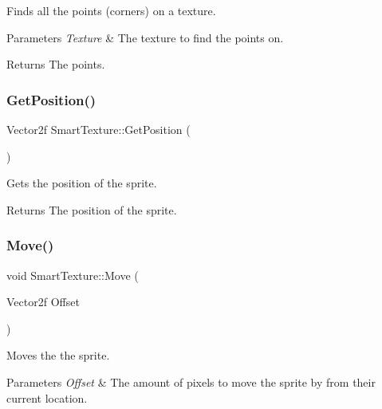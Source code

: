 Finds all the points (corners) on a texture. 


\begin{DoxyParams}{Parameters}
{\em Texture} & The texture to find the points on.\\
\hline
\end{DoxyParams}
\begin{DoxyReturn}{Returns}
The points.
\end{DoxyReturn}
\mbox{\label{struct_smart_texture_aec1d814d4f3dbbc6d5bf39e569b5fa30}} 
\subsubsection{\texorpdfstring{Get\+Position()}{GetPosition()}}
{\footnotesize\ttfamily Vector2f Smart\+Texture\+::\+Get\+Position (\begin{DoxyParamCaption}{ }\end{DoxyParamCaption})\hspace{0.3cm}{\ttfamily [inline]}}



Gets the position of the sprite. 

\begin{DoxyReturn}{Returns}
The position of the sprite.
\end{DoxyReturn}
\mbox{\label{struct_smart_texture_a26caafb4d4e040df68143747758569c0}} 
\subsubsection{\texorpdfstring{Move()}{Move()}}
{\footnotesize\ttfamily void Smart\+Texture\+::\+Move (\begin{DoxyParamCaption}\item[{Vector2f}]{Offset }\end{DoxyParamCaption})\hspace{0.3cm}{\ttfamily [inline]}}



Moves the the sprite. 


\begin{DoxyParams}{Parameters}
{\em Offset} & The amount of pixels to move the sprite by from their current location.\\
\hline
\end{DoxyParams}
\mbox{\label{struct_smart_texture_a2e8af63d05559a8e7d2c7b6b3c6f207e}} 
